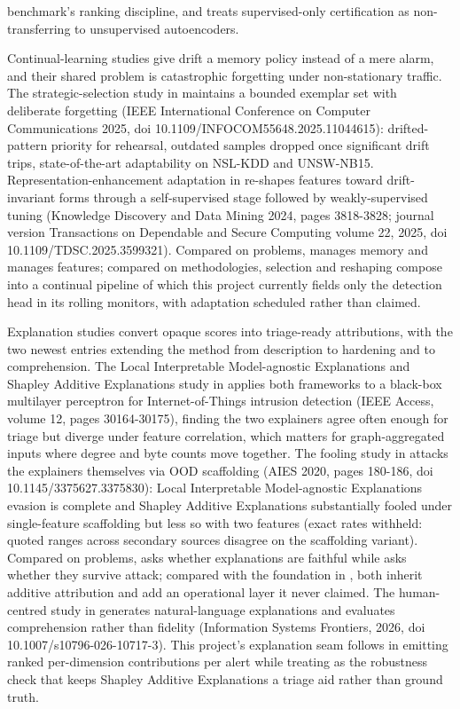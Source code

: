 benchmark's ranking discipline, and treats supervised-only certification as non-transferring to unsupervised autoencoders.

Continual-learning studies give drift a memory policy instead of a mere alarm, and their shared problem is catastrophic forgetting under non-stationary traffic. The strategic-selection study in \cite{k34} maintains a bounded exemplar set with deliberate forgetting (IEEE International Conference on Computer Communications 2025, doi 10.1109/INFOCOM55648.2025.11044615): drifted-pattern priority for rehearsal, outdated samples dropped once significant drift trips, state-of-the-art adaptability on NSL-KDD and UNSW-NB15. Representation-enhancement adaptation in \cite{k35} re-shapes features toward drift-invariant forms through a self-supervised stage followed by weakly-supervised tuning (Knowledge Discovery and Data Mining 2024, pages 3818-3828; journal version Transactions on Dependable and Secure Computing volume 22, 2025, doi 10.1109/TDSC.2025.3599321). Compared on problems, \cite{k34} manages memory and \cite{k35} manages features; compared on methodologies, selection and reshaping compose into a continual pipeline of which this project currently fields only the detection head in its rolling monitors, with adaptation scheduled rather than claimed.

Explanation studies convert opaque scores into triage-ready attributions, with the two newest entries extending the method from description to hardening and to comprehension. The Local Interpretable Model-agnostic Explanations and Shapley Additive Explanations study in \cite{k36} applies both frameworks to a black-box multilayer perceptron for Internet-of-Things intrusion detection (IEEE Access, volume 12, pages 30164-30175), finding the two explainers agree often enough for triage but diverge under feature correlation, which matters for graph-aggregated inputs where degree and byte counts move together. The fooling study in \cite{k37} attacks the explainers themselves via OOD scaffolding (AIES 2020, pages 180-186, doi 10.1145/3375627.3375830): Local Interpretable Model-agnostic Explanations evasion is complete and Shapley Additive Explanations substantially fooled under single-feature scaffolding but less so with two features (exact rates withheld: quoted ranges across secondary sources disagree on the scaffolding variant). Compared on problems, \cite{k36} asks whether explanations are faithful while \cite{k37} asks whether they survive attack; compared with the foundation in \cite{k29}, both inherit additive attribution and add an operational layer it never claimed. The human-centred study in \cite{k38} generates natural-language explanations and evaluates comprehension rather than fidelity (Information Systems Frontiers, 2026, doi 10.1007/s10796-026-10717-3). This project's explanation seam follows \cite{k36} in emitting ranked per-dimension contributions per alert while treating \cite{k37} as the robustness check that keeps Shapley Additive Explanations a triage aid rather than ground truth.

